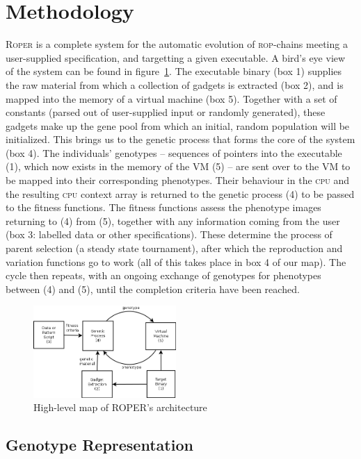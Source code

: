 \section{Methodology}\label{sec:methodology}

\textsc{Roper} is a complete system for the automatic evolution
of \textsc{rop}-chains meeting a user-supplied specification, and
targetting a given executable. A bird's eye view of the system
can be found in figure~\ref{fig:architecture}. The executable
binary (box 1) supplies the raw material from which a collection
of gadgets is extracted (box 2), and is mapped into the memory
of a virtual machine (box 5). Together with a set of constants
(parsed out of user-supplied input or randomly generated), these
gadgets make up the gene pool from which an initial, random
population will be initialized. This brings us to the genetic
process that forms the core of the system (box 4). The
individuals' genotypes -- sequences of pointers into the
executable (1), which now exists in the memory of the VM (5) --
are sent over to the VM to be mapped into their corresponding
phenotypes. Their behaviour in the \textsc{cpu} and the
resulting \textsc{cpu} context array is returned to the
genetic process (4) to be passed to the fitness functions.  The
fitness functions assess the phenotype images returning to (4)
from (5), together with any information coming from the user (box 3:
labelled data or other specifications). These determine the
process of parent selection (a steady state tournament), after which the
reproduction and variation functions go to work (all of this
takes place in box 4 of our map). The cycle then repeats, with an
ongoing exchange of genotypes for phenotypes between (4) and (5),
until the completion criteria have been reached. 

\begin{figure}
  \includegraphics[width=\columnwidth,height=3.5cm]{architecture.png}
  \caption{High-level map of ROPER's architecture}
  \label{fig:architecture}
\end{figure}

\subsection{Genotype Representation}



